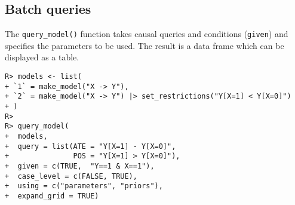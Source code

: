 \documentclass[
  11pt,
  article]{jss}
\begin{document}
\hypertarget{batch-queries}{%
\subsection{Batch queries}\label{batch-queries}}

The \texttt{query\_model()} function takes causal queries and conditions
(\texttt{given}) and specifies the parameters to be used. The result is
a data frame which can be displayed as a table.

\begin{verbatim}
R> models <- list(
+ `1` = make_model("X -> Y"),
+ `2` = make_model("X -> Y") |> set_restrictions("Y[X=1] < Y[X=0]")
+ )
R> 
R> query_model(
+  models,
+  query = list(ATE = "Y[X=1] - Y[X=0]", 
+               POS = "Y[X=1] > Y[X=0]"),
+  given = c(TRUE,  "Y==1 & X==1"),
+  case_level = c(FALSE, TRUE),
+  using = c("parameters", "priors"),
+  expand_grid = TRUE)
\end{verbatim}
\end{document}
